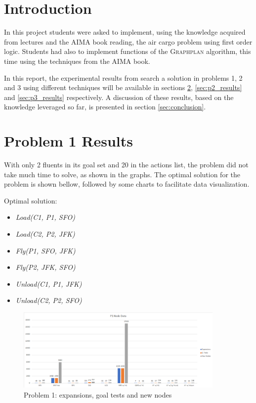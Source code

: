 \section{Introduction}\label{sec:introduction}

In this project students were asked to implement, using the knowledge acquired from lectures and the AIMA book reading, the air cargo problem using first order logic. Students had also to implement functions of the \textsc{Graphplan} algorithm, this time using the techniques from the AIMA book.

In this report, the experimental results from search a solution in problems 1, 2 and 3 using different techniques will be available in sections \ref{sec:p1_results}, \ref{sec:p2_results} and \ref{sec:p3_results} respectively. A discussion of these results, based on the knowledge leveraged so far, is presented in section \ref{sec:conclusion}.

\section{Problem 1 Results}\label{sec:p1_results}

With only 2 fluents in its goal set and 20 in the actions list, the problem did not take much time to solve, as shown in the graphs. The optimal solution for the problem is shown bellow, followed by some charts to facilitate data visualization.

\begin{flushleft}
	Optimal solution:
	\begin{itemize}
		\item \textit{Load(C1, P1, SFO)}
		\item \textit{Load(C2, P2, JFK)}
		\item \textit{Fly(P1, SFO, JFK)}
		\item \textit{Fly(P2, JFK, SFO)}
		\item \textit{Unload(C1, P1, JFK)}
		\item \textit{Unload(C2, P2, SFO)}
	\end{itemize}
\end{flushleft}

\begin{figure}[ht]
	\centering
	\includegraphics[width=0.9\textwidth]{images/P1_node_data.png}
	\caption{Problem 1: expansions, goal tests and new nodes}
	\label{fig:p1_node_data}
\end{figure}

